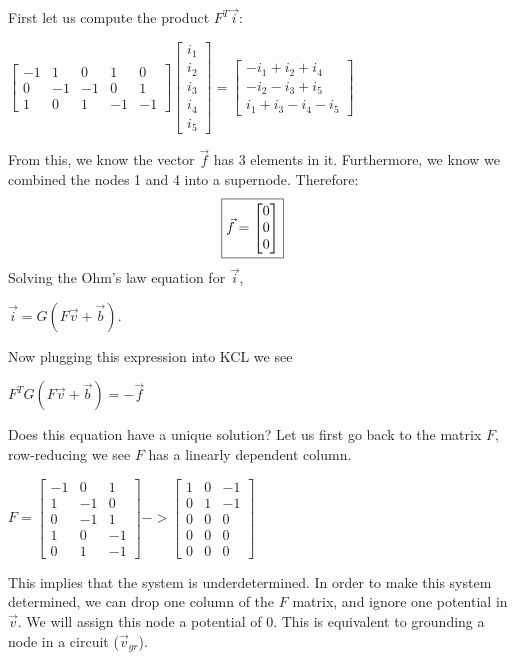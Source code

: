 \documentclass[letter]{article}
\newenvironment{menumerate}{%
  \edef\backupindent{\the\parindent}%
  \enumerate%
  \setlength{\parindent}{\backupindent}%
}{\endenumerate}
\begin{document}
\begin{menumerate}
\begin{menumerate}
        First let us compute the product $F^T\vec{i}:$
        \begin{center}
        $\begin{bmatrix}
        -1&1&0&1&0\\
        0&-1&-1&0&1\\
        1&0&1&-1&-1
        \end{bmatrix}
        \begin{bmatrix}
        i_1\\i_2\\i_3\\i_4\\i_5
        \end{bmatrix}
        =
        \begin{bmatrix}
        -i_1+i_2+i_4\\-i_2-i_3+i_5\\i_1+i_3-i_4-i_5
        \end{bmatrix}$
        \end{center}
        From this, we know the vector $\vec{f}$ has 3 elements in it. Furthermore, we know we combined the nodes 1 and 4 into a supernode. Therefore:
        \begin{align}
        \Aboxed{\vec{f} =
        \begin{bmatrix}
        0\\0\\0
        \end{bmatrix}}
        \end{align}
        Solving the Ohm’s law equation for $\vec{i}$,
        \begin{center}
        $\vec{i} = G(F\vec{v} + \vec{b})$.
        \end{center}
        Now plugging this expression into KCL we see
        \begin{center}$F^TG(F\vec{v} + \vec{b}) = -\vec{f}$
        \end{center}
        Does this equation have a unique solution?
        Let us first go back to the matrix $F$, row-reducing we see $F$ has a linearly dependent column.
        \begin{center}
        $F = \begin{bmatrix} -1&0&1\\1&-1&0\\0&-1&1\\1&0&-1\\0&1&-1\end{bmatrix} - > \begin{bmatrix} 1&0&-1\\0&1&-1\\0&0&0\\0&0&0\\0&0&0\end{bmatrix}
        $
        \end{center}
        This implies that the system is underdetermined. In order to make this system determined, we can drop one column of the $F$ matrix, and ignore one potential in $\vec{v}$. We will assign this node a potential of 0. This is equivalent to grounding a node in a circuit ($\vec{v}_{gr}$).


\end{menumerate}
\end{menumerate}
\end{document}
